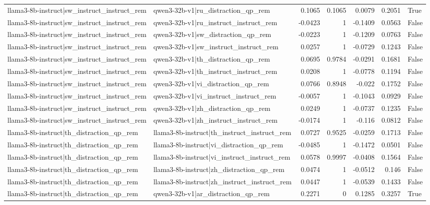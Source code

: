 \begin{table}
\begin{tabular}{l l r r r r l}
llama3-8b-instruct|sw_instruct_instruct_rem & qwen3-32b-v1|ru_distraction_qp_rem & 0.1065 & 0.1065 & 0.0079 & 0.2051 & True \\
llama3-8b-instruct|sw_instruct_instruct_rem & qwen3-32b-v1|ru_instruct_instruct_rem & -0.0423 & 1 & -0.1409 & 0.0563 & False \\
llama3-8b-instruct|sw_instruct_instruct_rem & qwen3-32b-v1|sw_distraction_qp_rem & -0.0223 & 1 & -0.1209 & 0.0763 & False \\
llama3-8b-instruct|sw_instruct_instruct_rem & qwen3-32b-v1|sw_instruct_instruct_rem & 0.0257 & 1 & -0.0729 & 0.1243 & False \\
llama3-8b-instruct|sw_instruct_instruct_rem & qwen3-32b-v1|th_distraction_qp_rem & 0.0695 & 0.9784 & -0.0291 & 0.1681 & False \\
llama3-8b-instruct|sw_instruct_instruct_rem & qwen3-32b-v1|th_instruct_instruct_rem & 0.0208 & 1 & -0.0778 & 0.1194 & False \\
llama3-8b-instruct|sw_instruct_instruct_rem & qwen3-32b-v1|vi_distraction_qp_rem & 0.0766 & 0.8948 & -0.022 & 0.1752 & False \\
llama3-8b-instruct|sw_instruct_instruct_rem & qwen3-32b-v1|vi_instruct_instruct_rem & -0.0057 & 1 & -0.1043 & 0.0929 & False \\
llama3-8b-instruct|sw_instruct_instruct_rem & qwen3-32b-v1|zh_distraction_qp_rem & 0.0249 & 1 & -0.0737 & 0.1235 & False \\
llama3-8b-instruct|sw_instruct_instruct_rem & qwen3-32b-v1|zh_instruct_instruct_rem & -0.0174 & 1 & -0.116 & 0.0812 & False \\
llama3-8b-instruct|th_distraction_qp_rem & llama3-8b-instruct|th_instruct_instruct_rem & 0.0727 & 0.9525 & -0.0259 & 0.1713 & False \\
llama3-8b-instruct|th_distraction_qp_rem & llama3-8b-instruct|vi_distraction_qp_rem & -0.0485 & 1 & -0.1472 & 0.0501 & False \\
llama3-8b-instruct|th_distraction_qp_rem & llama3-8b-instruct|vi_instruct_instruct_rem & 0.0578 & 0.9997 & -0.0408 & 0.1564 & False \\
llama3-8b-instruct|th_distraction_qp_rem & llama3-8b-instruct|zh_distraction_qp_rem & 0.0474 & 1 & -0.0512 & 0.146 & False \\
llama3-8b-instruct|th_distraction_qp_rem & llama3-8b-instruct|zh_instruct_instruct_rem & 0.0447 & 1 & -0.0539 & 0.1433 & False \\
llama3-8b-instruct|th_distraction_qp_rem & qwen3-32b-v1|ar_distraction_qp_rem & 0.2271 & 0 & 0.1285 & 0.3257 & True \\

\end{tabular}
\end{table}
